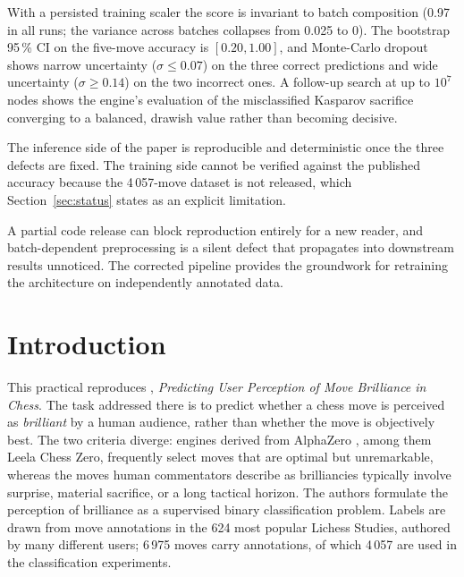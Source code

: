\documentclass[11pt,a4paper]{article}
\begin{document}
\begin{description}[leftmargin=1.2em,style=nextline]
    With a persisted training scaler the score is invariant to batch
    composition (0.97 in all runs; the variance across batches
    collapses from 0.025 to 0). The bootstrap 95\,\% CI on the
    five-move accuracy is $[0.20, 1.00]$, and Monte-Carlo dropout
    shows narrow uncertainty ($\sigma \le 0.07$) on the three correct
    predictions and wide uncertainty ($\sigma \ge 0.14$) on the two
    incorrect ones. A follow-up search at up to $10^7$ nodes shows the
    engine's evaluation of the misclassified Kasparov sacrifice
    converging to a balanced, drawish value rather than becoming
    decisive.
  \item[How did the analyses answer the central question?]
    The inference side of the paper is reproducible and deterministic
    once the three defects are fixed. The training side cannot be
    verified against the published accuracy because the 4\,057-move
    dataset is not released, which Section~\ref{sec:status} states as
    an explicit limitation.
  \item[What does this answer tell us about the broader field?]
    A partial code release can block reproduction entirely for a new
    reader, and batch-dependent preprocessing is a silent defect that
    propagates into downstream results unnoticed. The corrected
    pipeline provides the groundwork for retraining the architecture
    on independently annotated data.
\end{description}

\section{Introduction}

This practical reproduces \citet{zaidi2024brilliant}, \emph{Predicting
User Perception of Move Brilliance in Chess}. The task addressed there
is to predict whether a chess move is perceived as \emph{brilliant} by
a human audience, rather than whether the move is objectively best.
The two criteria diverge: engines derived from AlphaZero
\citep{silver2018general}, among them Leela Chess Zero, frequently
select moves that are optimal but unremarkable, whereas the moves
human commentators describe as brilliancies typically involve
surprise, material sacrifice, or a long tactical horizon. The authors
formulate the perception of brilliance as a supervised binary
classification problem. Labels are drawn from move annotations in the
624 most popular Lichess Studies, authored by many different users;
6\,975 moves carry annotations, of which 4\,057 are used in the
classification experiments.
\end{document}
